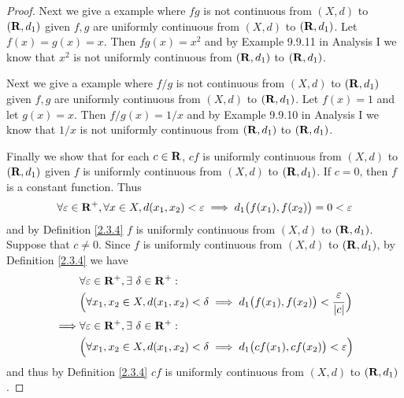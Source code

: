\begin{proof}
    Next we give a example where \(fg\) is not continuous from \((X, d)\) to \((\mathbf{R}, d_1)\) given \(f, g\) are uniformly continuous from \((X, d)\) to \((\mathbf{R}, d_1)\).
    Let \(f(x) = g(x) = x\).
    Then \(fg(x) = x^2\) and by Example 9.9.11 in Analysis I we know that \(x^2\) is not uniformly continuous from \((\mathbf{R}, d_1)\) to \((\mathbf{R}, d_1)\).

    Next we give a example where \(f / g\) is not continuous from \((X, d)\) to \((\mathbf{R}, d_1)\) given \(f, g\) are uniformly continuous from \((X, d)\) to \((\mathbf{R}, d_1)\).
    Let \(f(x) = 1\) and let \(g(x) = x\).
    Then \(f / g(x) = 1 / x\) and by Example 9.9.10 in Analysis I we know that \(1 / x\) is not uniformly continuous from \((\mathbf{R}, d_1)\) to \((\mathbf{R}, d_1)\).

    Finally we show that for each \(c \in \mathbf{R}\), \(cf\) is uniformly continuous from \((X, d)\) to \((\mathbf{R}, d_1)\) given \(f\) is uniformly continuous from \((X, d)\) to \((\mathbf{R}, d_1)\).
    If \(c = 0\), then \(f\) is a constant function.
    Thus
    \[
        \forall \varepsilon \in \mathbf{R}^+, \forall x \in X, d(x_1, x_2) < \varepsilon \implies d_1\big(f(x_1), f(x_2)\big) = 0 < \varepsilon
    \]
    and by Definition \ref{2.3.4} \(f\) is uniformly continuous from \((X, d)\) to \((\mathbf{R}, d_1)\).
    Suppose that \(c \neq 0\).
    Since \(f\) is uniformly continuous from \((X, d)\) to \((\mathbf{R}, d_1)\), by Definition \ref{2.3.4} we have
    \begin{align*}
                 & \forall \varepsilon \in \mathbf{R}^+, \exists\ \delta \in \mathbf{R}^+:                                                                   \\
                 & \Big(\forall x_1, x_2 \in X, d(x_1, x_2) < \delta \implies d_1\big(f(x_1), f(x_2)\big) < \frac{\varepsilon}{\left\lvert c\right\rvert}\Big) \\
        \implies & \forall \varepsilon \in \mathbf{R}^+, \exists\ \delta \in \mathbf{R}^+:                                                                   \\
                 & \Big(\forall x_1, x_2 \in X, d(x_1, x_2) < \delta \implies d_1\big(cf(x_1), cf(x_2)\big) < \varepsilon\Big)
    \end{align*}
    and thus by Definition \ref{2.3.4} \(cf\) is uniformly continuous from \((X, d)\) to \((\mathbf{R}, d_1)\).
\end{proof}